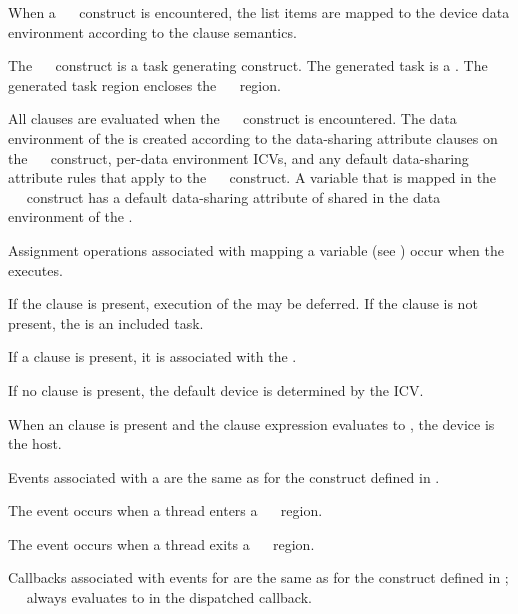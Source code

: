 \descr
When a ~~ construct is encountered, the 
list items are mapped to the device data environment according to the  
clause semantics.

The ~~ construct is a task generating 
construct.  The generated task is a .  The generated task 
region encloses the ~~ region.

All clauses are evaluated when the ~~ 
construct is encountered.  The data environment of the  
is created according to the data-sharing attribute clauses on the 
~~ construct, per-data environment ICVs, 
and any default data-sharing attribute rules that apply to the 
~~ construct.  A variable that is 
mapped in the ~~ construct has a 
default data-sharing attribute of shared in the data environment of 
the .

Assignment operations associated with mapping a variable (see 
) occur when the  executes.

If the  clause is present, execution of the  
may be deferred.  If the  clause is not present, the 
 is an included task.

If a  clause is present, it is associated with the .

If no  clause is present, the default device is determined by the 
 ICV.

When an  clause is present and the  clause expression 
evaluates to , the device is the host.

\events

Events associated with a  are the same as for the  
construct defined in .

The  event occurs when a thread enters a
~~ region.

The  event occurs when a thread exits a
~~ region.

\tools
Callbacks associated with events for  are the same as 
for the  construct defined in ;
\code{(}~\code{&}~ 
always evaluates to  in the dispatched callback.

